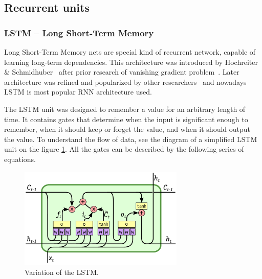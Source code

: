 	\subsection{Recurrent units}\label{subsec:recUnits}


		\subsubsection{LSTM -- Long Short-Term Memory}\label{subsubsec:lstm}

Long Short-Term Memory nets are special kind of recurrent network, capable of learning long-term dependencies. This architecture was introduced by Hochreiter \& Schmidhuber~\cite{Hochreiter:1997:LSM:1246443.1246450} after prior research of vanishing gradient problem~\cite{hochreiter1991untersuchungen}. Later architecture was refined and popularized by other researchers~\cite{DBLP:conf/ijcnn/GersS00,DBLP:journals/neco/GersSC00} and nowadays LSTM is most popular RNN architecture used.

The LSTM unit was designed to remember a value for an arbitrary length of time. It contains gates that determine when the input is significant enough to remember, when it should keep or forget the value, and when it should output the value. To understand the flow of data, see the diagram of a simplified LSTM unit on the figure \ref{fig:lstm}. All the gates can be described by the following series of equations.

\begin{figure}[!t]
	\centering
	\includegraphics[width=0.7\textwidth]{./fig/lstm-peepholes.pdf}
	\caption{Variation of the LSTM.
		\label{fig:lstm}}
\end{figure}

